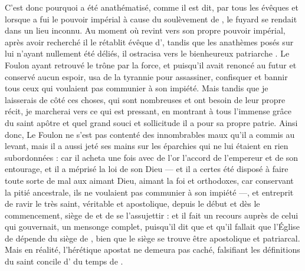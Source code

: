 C'est donc pourquoi  a été anathématisé, comme il est dit,
par tous les évêques et lorsque  a fui le pouvoir impérial à cause du soulèvement de , le fuyard se rendait dans un lieu inconnu. %
Au moment où  revint vers son propre pouvoir impérial, après avoir recherché  il le rétablit évêque d', tandis que les anathèmes posés sur lui n'ayant nullement été déliés, il ostracisa vers  le bienheureux patriarche . %
Le Foulon ayant retrouvé le trône  par la force,
et puisqu'il avait renoncé au futur  et conservé aucun espoir, 
usa de la tyrannie pour assassiner, confisquer et bannir tous ceux qui voulaient pas communier à son impiété.
Mais tandis que je laisserais de côté ces choses,
qui sont nombreuses et ont besoin de leur propre récit, %
je marcherai vers ce qui est pressant, 
en montrant à tous l'immense grâce  du saint apôtre  et 
quel grand souci et sollicitude il a pour sa propre patrie.
Ainsi donc, Le Foulon ne s'est pas contenté des innombrables maux 
qu'il a commis au levant, 
mais il a aussi jeté ses mains sur les éparchies qui ne lui étaient en rien subordonnées :
car  il acheta une fois avec de l'or l'accord de l'empereur et de son entourage, et il a méprisé la loi de son Dieu 
--- et il a certes été disposé à faire toute sorte de mal aux  aimant Dieu, aimant la foi et orthodoxes, car conservant la pitié ancestrale, ils ne voulaient pas communier à son impiété ---,
et  entreprit de ravir le très saint, véritable et apostolique, depuis le  début et dès le commencement, siège de  et de se l'assujettir : %
et il fait un recours auprès de celui qui gouvernait, un mensonge complet, puisqu'il dit que      %
et qu'il fallait que l'Église de  dépende du siège de ,
bien que le siège se trouve être apostolique et patriarcal. %
Mais en réalité,  l'hérétique apostat ne demeura pas caché, falsifiant les définitions du saint concile d' du temps de .
